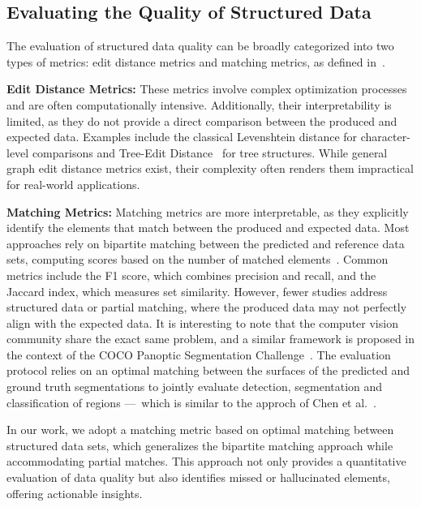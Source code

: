 \subsection{Evaluating the Quality of Structured Data}
\label{sec:evaluating-structured-data}

The evaluation of structured data quality can be broadly categorized into two types of metrics: edit distance metrics and matching metrics, as defined in~\cite{chen_unified_2023}.

\textbf{Edit Distance Metrics:}  
These metrics involve complex optimization processes and are often computationally intensive. Additionally, their interpretability is limited, as they do not provide a direct comparison between the produced and expected data. Examples include the classical Levenshtein distance for character-level comparisons and Tree-Edit Distance~\cite{zhang_simple_1989} for tree structures. While general graph edit distance metrics exist, their complexity often renders them impractical for real-world applications.

\textbf{Matching Metrics:}  
Matching metrics are more interpretable, as they explicitly identify the elements that match between the produced and expected data. Most approaches rely on bipartite matching between the predicted and reference data sets, computing scores based on the number of matched elements~\cite{chen_unified_2023}. Common metrics include the F1 score, which combines precision and recall, and the Jaccard index, which measures set similarity. However, fewer studies address structured data or partial matching, where the produced data may not perfectly align with the expected data. 
It is interesting to note that the computer vision community share the exact same problem, and a similar framework is proposed in the context of the COCO Panoptic Segmentation Challenge~\cite{kirillov_panoptic_2019}. The evaluation protocol relies on an optimal matching between the surfaces of the predicted and ground truth segmentations to jointly evaluate detection, segmentation and classification of regions ---~which is similar to the approch of Chen et al.~\cite{chen_unified_2023}.

In our work, we adopt a matching metric based on optimal matching between structured data sets, which generalizes the bipartite matching approach while accommodating partial matches. This approach not only provides a quantitative evaluation of data quality but also identifies missed or hallucinated elements, offering actionable insights.

